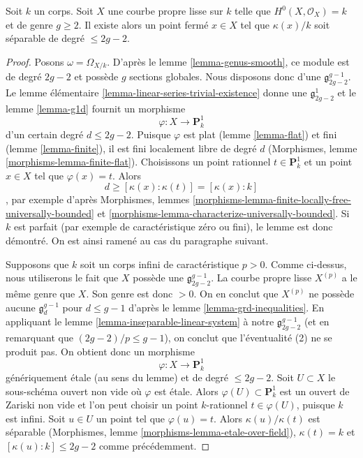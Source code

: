 \begin{lemma}
\label{lemma-point-over-separable-extension}
Soit $k$ un corps. Soit $X$ une courbe propre lisse sur $k$ telle que $H^0(X, \mathcal{O}_X) = k$ et de genre $g \geq 2$. Il existe alors un point fermé $x \in X$ tel que $\kappa(x)/k$ soit séparable de degré $\leq 2g - 2$.
\end{lemma}

\begin{proof}
Posons $\omega = \Omega_{X/k}$. D'après le lemme \ref{lemma-genus-smooth}, ce module est de degré $2g - 2$ et possède $g$ sections globales. Nous disposons donc d'une $\mathfrak g^{g - 1}_{2g - 2}$. Le lemme élémentaire \ref{lemma-linear-series-trivial-existence} donne une $\mathfrak g^1_{2g - 2}$ et le lemme \ref{lemma-g1d} fournit un morphisme $$
\varphi : X \longrightarrow \mathbf{P}^1_k
$$ d'un certain degré $d \leq 2g - 2$. Puisque $\varphi$ est plat (lemme \ref{lemma-flat}) et fini (lemme \ref{lemma-finite}), il est fini localement libre de degré $d$ (Morphismes, lemme \ref{morphisms-lemma-finite-flat}). Choisissons un point rationnel $t \in \mathbf{P}^1_k$ et un point $x \in X$ tel que $\varphi(x) = t$. Alors $$
d \geq [\kappa(x) : \kappa(t)] = [\kappa(x) : k]
$$, par exemple d'après Morphismes, lemmes \ref{morphisms-lemma-finite-locally-free-universally-bounded} et \ref{morphisms-lemma-characterize-universally-bounded}. Si $k$ est parfait (par exemple de caractéristique zéro ou fini), le lemme est donc démontré. On est ainsi ramené au cas du paragraphe suivant.

\medskip\noindent
Supposons que $k$ soit un corps infini de caractéristique $p > 0$. Comme ci-dessus, nous utiliserons le fait que $X$ possède une $\mathfrak g^{g - 1}_{2g - 2}$. La courbe propre lisse $X^{(p)}$ a le même genre que $X$. Son genre est donc $> 0$. On en conclut que $X^{(p)}$ ne possède aucune $\mathfrak g^{g - 1}_d$ pour $d \leq g - 1$ d'après le lemme \ref{lemma-grd-inequalities}. En appliquant le lemme \ref{lemma-inseparable-linear-system} à notre $\mathfrak g^{g - 1}_{2g - 2}$ (et en remarquant que $(2g - 2)/p \leq g - 1$), on conclut que l'éventualité (2) ne se produit pas. On obtient donc un morphisme $$
\varphi : X \longrightarrow \mathbf{P}^1_k
$$ génériquement \'etale (au sens du lemme) et de degré $\leq 2g - 2$. Soit $U \subset X$ le sous-schéma ouvert non vide où $\varphi$ est \'etale. Alors $\varphi(U) \subset \mathbf{P}^1_k$ est un ouvert de Zariski non vide et l'on peut choisir un point $k$-rationnel $t \in \varphi(U)$, puisque $k$ est infini. Soit $u \in U$ un point tel que $\varphi(u) = t$. Alors $\kappa(u)/\kappa(t)$ est séparable (Morphismes, lemme \ref{morphisms-lemma-etale-over-field}), $\kappa(t) = k$ et $[\kappa(u) : k] \leq 2g - 2$ comme précédemment.
\end{proof}

